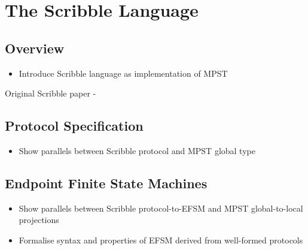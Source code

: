 \section{The Scribble Language}

\subsection{Overview}
\begin{itemize}
\item Introduce Scribble language as implementation of MPST
\end{itemize}

Original Scribble paper - \cite{Scribble}

\subsection{Protocol Specification}
\begin{itemize}
\item Show parallels between Scribble protocol and MPST global type
\end{itemize}

\subsection{Endpoint Finite State Machines}
\begin{itemize}
\item Show parallels between Scribble protocol-to-EFSM and MPST global-to-local projections
\item Formalise syntax and properties of EFSM derived from well-formed protocols
\end{itemize}

